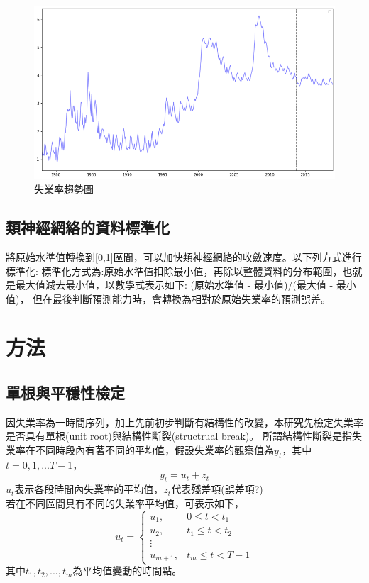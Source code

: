 \documentclass[oneside]{book}
\begin{document}
\begin{figure}

{\centering \includegraphics[width=.6\linewidth]{./fig/Unem} 

}

\caption{失業率趨勢圖}\label{fig:unemm}
\end{figure}

\hypertarget{ux985eux795eux7d93ux7db2ux7d61ux7684ux8cc7ux6599ux6a19ux6e96ux5316}{%
\section{類神經網絡的資料標準化}\label{ux985eux795eux7d93ux7db2ux7d61ux7684ux8cc7ux6599ux6a19ux6e96ux5316}}

將原始水準值轉換到{[}0,1{]}區間，可以加快類神經網絡的收斂速度。以下列方式進行標準化:
標準化方式為:原始水準值扣除最小值，再除以整體資料的分布範圍，也就是最大值減去最小值，以數學式表示如下:
(原始水準值 - 最小值)/(最大值 - 最小值)，
但在最後判斷預測能力時，會轉換為相對於原始失業率的預測誤差。

\hypertarget{ux65b9ux6cd5}{%
\chapter{方法}\label{ux65b9ux6cd5}}

\hypertarget{ux55aeux6839ux8207ux5e73ux7a69ux6027ux6aa2ux5b9a}{%
\section{單根與平穩性檢定}\label{ux55aeux6839ux8207ux5e73ux7a69ux6027ux6aa2ux5b9a}}

因失業率為一時間序列，加上先前初步判斷有結構性的改變，本研究先檢定失業率是否具有單根(unit root)與結構性斷裂(structrual break)。
所謂結構性斷裂是指失業率在不同時段內有著不同的平均值，假設失業率的觀察值為\(y_t\)，其中\(t=0,1,...T-1\)，
\[y_t = u_t + z_t\]
\(u_t\)表示各段時間內失業率的平均值，\(z_t\)代表殘差項(誤差項?)\\
若在不同區間具有不同的失業率平均值，可表示如下，
\[
 u_t = 
  \begin{cases} 
   u_1, & 0 \leq t<t_1 \\
   u_2, & t_1 \leq t<t_2 \\
   \vdots \\
   u_{m+1}, & t_m \leq t<T-1
  \end{cases}
\]
其中\(t_1,t_2,...,t_m\)為平均值變動的時間點。
\end{document}
